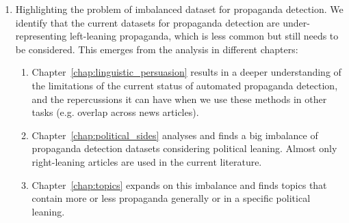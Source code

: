 \begin{enumerate}
\begin{enumerate}
    \end{enumerate}
    \item Highlighting the problem of imbalanced dataset for propaganda detection.
    We identify that the current datasets for propaganda detection are under-representing left-leaning propaganda, which is less common but still needs to be considered.
    This emerges from the analysis in different chapters:
    \begin{enumerate}
        \item Chapter~\ref{chap:linguistic_persuasion} results in a deeper understanding of the limitations of the current status of automated propaganda detection, and the repercussions it can have when we use these methods in other tasks (e.g. overlap across news articles).
        \item Chapter~\ref{chap:political_sides} analyses and finds a big imbalance of propaganda detection datasets considering political leaning. Almost only right-leaning articles are used in the current literature.
        \item Chapter~\ref{chap:topics} expands on this imbalance and finds topics that contain more or less propaganda generally or in a specific political leaning.
    \end{enumerate}

    



\end{enumerate}
